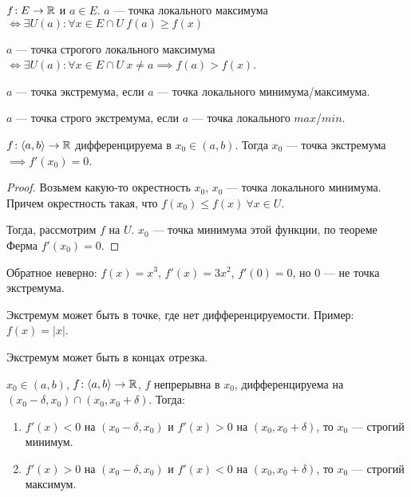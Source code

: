 \begin{definition}
    $f\!: E \to \mathbb{R}$ и  $a \in E$. $a$ --- точка локального максимума $\iff \exists U(a)\!: \forall x \in E \cap U\ f(a)\ge f(x)$ 
\end{definition}
\begin{definition}
    $a$ --- точка строгого локального максимума  $\iff \exists U(a)\!: \forall x \in E \cap U\ x \neq a \implies f(a) > f(x)$.
\end{definition}
\begin{definition}
    $a$ --- точка экстремума, если  $a$ --- точка локального минимума/максимума.
\end{definition}
\begin{definition}
    $a$ --- точка строго экстремума, если  $a$ --- точка локального  $max$/$min$.
\end{definition}
\begin{theorem}
    $f\!:\langle a, b \rangle \to \mathbb{R}$ дифференцируема в  $x_0 \in (a, b)$. Тогда  $x_0$ --- точка экстремума  $\implies f'(x_0) = 0$.
\end{theorem}
\begin{proof}
    Возьмем какую-то окрестность $x_0$, $x_0$ --- точка локального минимума. Причем окрестность такая, что $f(x_0) \le f(x)\ \forall x \in U$. 

    Тогда, рассмотрим $f$ на  $U$.  $x_0$ --- точка минимума этой функции, по теореме Ферма  $f'(x_0) = 0$.
\end{proof}
\begin{remark}
    Обратное неверно: $f(x) = x^3$,  $f'(x) = 3x^2$,  $f'(0) = 0$, но  $0$ --- не точка экстремума.
\end{remark}
\begin{remark}
    Экстремум может быть в точке, где нет дифференцируемости. Пример: $f(x) = |x|$.
\end{remark}
\begin{remark}
    Экстремум может быть в концах отрезка. 
\end{remark}
\begin{theorem}
    $x_0 \in (a, b)$,  $f\!:\langle a, b \rangle \to \mathbb{R}$,  $f$ непрерывна в  $x_0$, дифференцируема на  $(x_0 - \delta, x_0) \cap (x_0, x_0 + \delta)$. Тогда: 
    \begin{enumerate}
        \item $f'(x) < 0$ на  $(x_0-\delta, x_0)$ и $f'(x) > 0$ на  $(x_0, x_0+\delta)$, то $x_0$ --- строгий минимум.
        \item $f'(x) > 0$ на  $(x_0-\delta, x_0)$ и $f'(x) < 0$ на  $(x_0, x_0+\delta)$, то $x_0$ --- строгий максимум.
    \end{enumerate}
\end{theorem}
